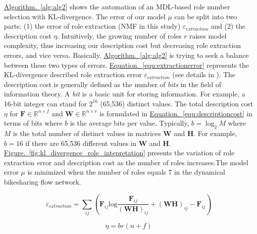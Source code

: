 \documentclass[a4paper,fleqn]{cas-sc}
\begin{document}
\hyperref[alg:alg2]{Algorithm.~\ref{alg:alg2}} shows the automation of an MDL-based role number selection with KL-divergence. The error of our model $\mu$ can be split into two parts: (1) the error of role extraction (NMF in this study) $\varepsilon_{extraction}$ and (2) the description cost $\eta$. Intuitively, the growing number of roles $r$ raises model complexity, thus increasing our description cost but decreasing role extraction errors, and vice versa. Basically, \hyperref[alg:alg2]{Algorithm.~\ref{alg:alg2}} is trying to seek a balance between these two types of errors. \hyperref[equ:extractionerror]{Equation.~\ref{equ:extractionerror}} represents the KL-divergence described role extraction error $\varepsilon_{extraction}$ (see details in \cite{yang2011kullback}). The description cost is generally defined as the number of \textit{bits} in the field of information theory. A \textit{bit} is a basic unit for storing information. For example, a 16-bit integer can stand for $2^{16}$ (65,536) distinct values. The total description cost $\eta$ for $\textbf{F}\in \mathbb{R}^{n\times f}$ and 
$\textbf{
W}\in \mathbb{R}^{n\times r}$ is formulated in \hyperref[equ:descriptioncost]{Equation.~\ref{equ:descriptioncost}} in terms of bits where $b$ is the average bits per value. Typically, $b=\log_{2}{M}$ where $M$ is the total number of distinct values in matrices \textbf{W} and \textbf{H}. For example, $b = 16$ if there are 65,536 different values in \textbf{W} and \textbf{H}. \hyperref[fig:kl_divergence_role_intepretation]{Figure.~\ref{fig:kl_divergence_role_intepretation}} presents  the variation of role extraction error and description cost as the number of roles increases.The model error $\mu$ is minimized when the number of roles equals 7 in the dynamical bikesharing flow network. 


\begin{equation}
\varepsilon_{extraction} = \sum\limits_{ij}(\textbf{F}_{ij}\text{log}\frac{\textbf{F}_{ij}}{(\textbf{WH})_{ij}} + (\textbf{WH})_{ij} - \textbf{F}_{ij})
\label{equ:extractionerror}
\end{equation}

\begin{equation}
\eta = br(n + f)
\label{equ:descriptioncost}
\end{equation}
\end{document}
